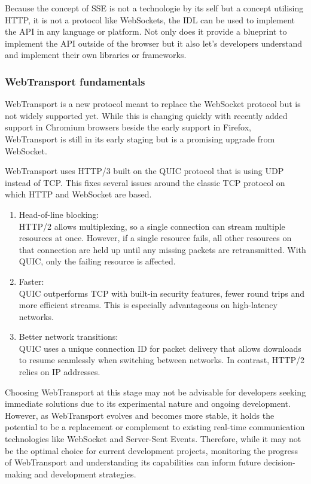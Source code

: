 Because the concept of SSE is not a technologie by its self but a concept utilising HTTP, it is not a protocol like WebSockets, the IDL can be used to implement the API in any language or platform. Not only does it provide a blueprint to implement the API outside of the browser but it also let's developers understand and implement their own libraries or frameworks.

\subsubsection{WebTransport fundamentals}

WebTransport is a new protocol meant to replace the WebSocket protocol but is not widely supported yet. While this is changing quickly with recently added support in Chromium browsers beside the early support in Firefox, WebTransport is still in its early staging but is a promising upgrade from WebSocket.

WebTransport uses HTTP/3 built on the QUIC protocol that is using UDP instead of TCP. This fixes several issues around the classic TCP protocol on which HTTP and WebSocket are based. \cite{w3-wt}

\begin{enumerate}
  \item Head-of-line blocking: \\ HTTP/2 allows multiplexing, so a single connection can stream multiple resources at once. However, if a single resource fails, all other resources on that connection are held up until any missing packets are retransmitted. With QUIC, only the failing resource is affected.
  \item Faster: \\ QUIC outperforms TCP with built-in security features, fewer round trips and more efficient streams. This is especially advantageous on high-latency networks.
  \item Better network transitions: \\ QUIC uses a unique connection ID for packet delivery that allows downloads to resume seamlessly when switching between networks. In contrast, HTTP/2 relies on IP addresses.
\end{enumerate}

Choosing WebTransport at this stage may not be advisable for developers seeking immediate solutions due to its experimental nature and ongoing development. However, as WebTransport evolves and becomes more stable, it holds the potential to be a replacement or complement to existing real-time communication technologies like WebSocket and Server-Sent Events. Therefore, while it may not be the optimal choice for current development projects, monitoring the progress of WebTransport and understanding its capabilities can inform future decision-making and development strategies.

